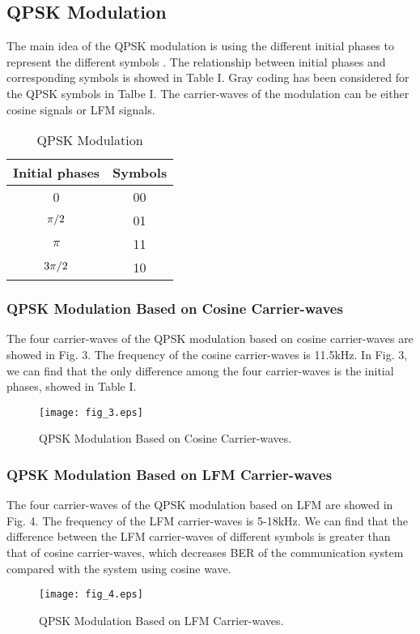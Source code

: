 \documentclass[journal]{IEEEtran}
\begin{document}
\subsection{QPSK Modulation}
The main idea of the QPSK modulation is using the different initial
phases to represent the different symbols \cite{Goldsmith2005}. The
relationship between initial phases and corresponding symbols is
showed in Table I. Gray coding has been considered for the QPSK
symbols in Talbe I. The carrier-waves of the modulation can be
either cosine signals or LFM signals.
\begin{table}[!t]
\renewcommand{\arraystretch}{1.3}
\caption{QPSK Modulation} \label{table_example} \centering
\begin{tabular}{c||c}
\hline
\bfseries Initial phases & \bfseries Symbols\\
\hline\hline
0                                                                                            &   00   \\
${\pi  \mathord{\left/ {\vphantom {\pi  2}} \right.\kern-\nulldelimiterspace} 2}$            &   01   \\
$\pi$                                                                                        &   11   \\
${{3\pi } \mathord{\left/ {\vphantom {{3\pi } 2}} \right.\kern-\nulldelimiterspace} 2}$      &   10   \\
\hline
\end{tabular}
\end{table}
\subsubsection{QPSK Modulation Based on Cosine Carrier-waves}
The four carrier-waves of the QPSK modulation based on cosine
carrier-waves are showed in Fig. 3. The frequency of the cosine
carrier-waves is 11.5kHz. In Fig. 3, we can find that the only
difference among the four carrier-waves is the initial phases,
showed in Table I.
\begin{figure}[!t]
\centering
\texttt{[image: fig\_3.eps]}
\caption{QPSK Modulation Based on Cosine Carrier-waves.}
\label{fig_sim}
\end{figure}
\subsubsection{QPSK Modulation Based on LFM Carrier-waves}
The four carrier-waves of the QPSK modulation based on LFM are
showed in Fig. 4. The frequency of the LFM carrier-waves is 5-18kHz.
We can find that the difference between the LFM carrier-waves of
different symbols is greater than that of cosine carrier-waves,
which decreases BER of the communication system compared with the
system using cosine wave.
\begin{figure}[!t]
\centering
\texttt{[image: fig\_4.eps]}
\caption{QPSK Modulation Based on LFM Carrier-waves.}
\label{fig_sim}
\end{figure}
\end{document}
